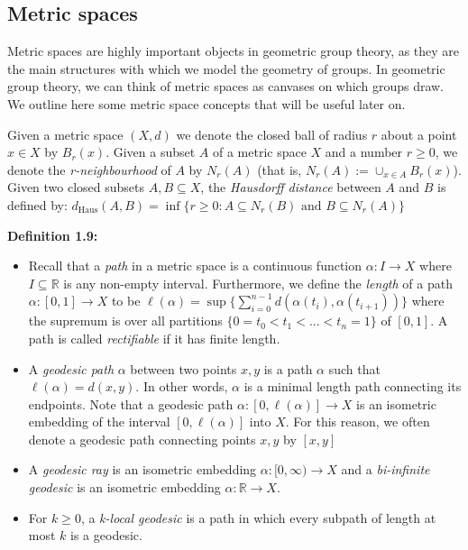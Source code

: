 \documentclass[12pt]{article}
\newcommand{\vs}{\vskip10pt}
\begin{document}
	
	\newpage
	
	\subsection{Metric spaces}
	
	Metric spaces are highly important objects in geometric group theory, as they are the main structures with which we model the geometry of groups. In geometric group theory, we can think of metric spaces as canvases on which groups draw. We outline here some metric space concepts that will be useful later on.
	
	\vs 
	
	Given a metric space $(X,d)$ we denote the closed ball of radius $r$ about a point $x \in X$ by $B_r(x)$. Given a subset $A$ of a metric space $X$ and a number $r \geq 0$, we denote the \textit{r-neighbourhood} of $A$ by $N_r(A)$ (that is, $N_r(A) := \cup_{x \in A} B_r(x)$). Given two closed subsets $A,B \subseteq X$, the \textit{Hausdorff distance} between $A$ and $B$ is defined by: $d_{\text{Haus}}(A,B) = \inf\{r \geq 0: A \subseteq N_r(B) \text{ and } B \subseteq N_r(A)\}$ 
	
	\vs 
	
	\textbf{Definition 1.9: } 
	
	\begin{itemize}
		\item Recall that a \textit{path} in a metric space is a continuous function $\alpha: I \rightarrow X$ where $I \subseteq \mathbb{R}$ is any non-empty interval. Furthermore, we define the \textit{length} of a path $\alpha: [0,1] \rightarrow X$ to be $\ell(\alpha) = \sup \{\sum_{i=0}^{n-1} d(\alpha(t_i), \alpha(t_{i+1}))\}$ where the supremum is over all partitions $\{0 = t_0 < t_1 < ... < t_n = 1\}$ of $[0,1]$. A path is called \textit{rectifiable} if it has finite length.  
		\item A \textit{geodesic path} $\alpha$ between two points $x,y$ is a path $\alpha$ such that $\ell(\alpha) = d(x,y)$. In other words, $\alpha$ is a minimal length path connecting its endpoints. Note that a geodesic path $\alpha: [0, \ell(\alpha)] \rightarrow X$ is an isometric embedding of the interval $[0, \ell(\alpha)]$ into $X$. For this reason, we often denote a geodesic path connecting points $x,y$ by $[x,y]$
		\item A \textit{geodesic ray} is an isometric embedding $\alpha: [0, \infty) \rightarrow X$ and a \textit{bi-infinite geodesic} is an isometric embedding $\alpha: \mathbb{R} \rightarrow X$. 
		\item For $k \geq 0$, a \textit{k-local geodesic} is a path in which every subpath of length at most $k$ is a geodesic. 
	\end{itemize}
	
\end{document}
